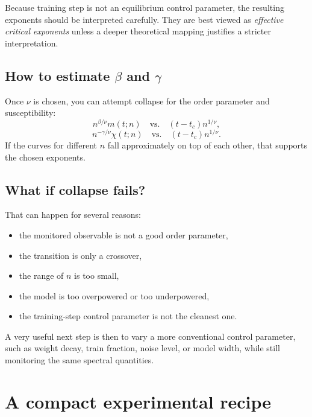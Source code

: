 \documentclass[11pt]{article}
\begin{document}
Because training step is not an equilibrium control parameter, the resulting exponents should be interpreted carefully. They are best viewed as \emph{effective critical exponents} unless a deeper theoretical mapping justifies a stricter interpretation.

\subsection{How to estimate $\beta$ and $\gamma$}

Once $\nu$ is chosen, you can attempt collapse for the order parameter and susceptibility:
\begin{equation}
    n^{\beta/\nu} m(t;n) \quad \text{vs.} \quad (t-t_c)n^{1/\nu},
\end{equation}
\begin{equation}
    n^{-\gamma/\nu} \chi(t;n) \quad \text{vs.} \quad (t-t_c)n^{1/\nu}.
\end{equation}
If the curves for different $n$ fall approximately on top of each other, that supports the chosen exponents.

\subsection{What if collapse fails?}

That can happen for several reasons:
\begin{itemize}
    \item the monitored observable is not a good order parameter,
    \item the transition is only a crossover,
    \item the range of $n$ is too small,
    \item the model is too overpowered or too underpowered,
    \item the training-step control parameter is not the cleanest one.
\end{itemize}

A very useful next step is then to vary a more conventional control parameter, such as weight decay, train fraction, noise level, or model width, while still monitoring the same spectral quantities.

\section{A compact experimental recipe}
\end{document}
